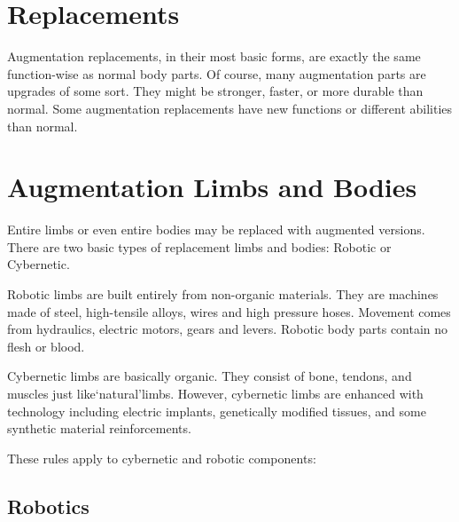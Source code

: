 \documentclass[twoside]{book}
\begin{document}
    

\section{Replacements}
    
    {  
    Augmentation replacements, in their most basic forms, are exactly the same function-wise as normal body parts. Of course, many augmentation parts are upgrades of some sort. They might be stronger, faster, or more durable than normal. Some augmentation replacements have new functions or different abilities than normal.
    }
  
    

\section{Augmentation Limbs and Bodies}
    
    {  
    Entire limbs or even entire bodies may be replaced with augmented versions. There are two basic types of replacement limbs and bodies: Robotic or Cybernetic.
    }
  
    {  
    Robotic limbs are built entirely from non-organic materials. They are machines made of steel, high-tensile alloys, wires and high pressure hoses. Movement comes from hydraulics, electric motors, gears and levers. Robotic body parts contain no flesh or blood.
    }
  
    {  
    Cybernetic limbs are basically organic. They consist of bone, tendons, and muscles just like`natural'limbs. However, cybernetic limbs are enhanced with technology including electric implants, genetically modified tissues, and some synthetic material reinforcements.
    }
  
    {  
    These rules apply to cybernetic and robotic components:
    }
  
    

\subsection{Robotics}
    
\end{document}
